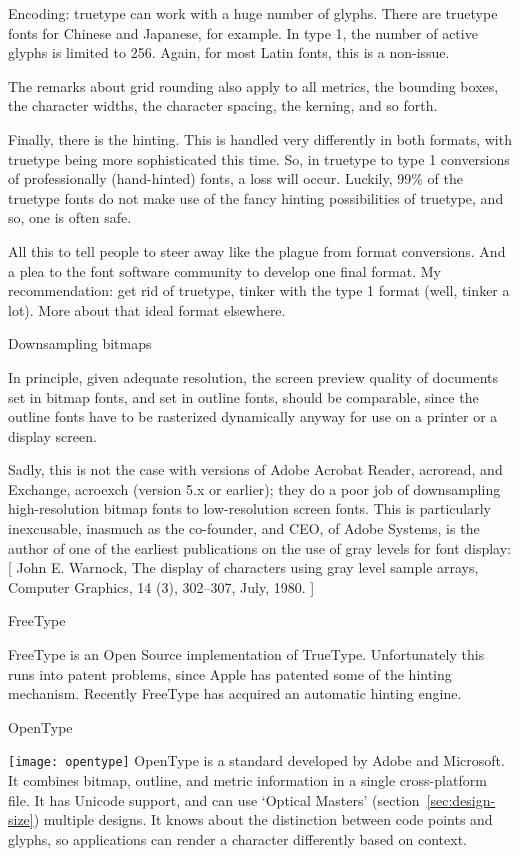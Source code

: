 Encoding: truetype can work with a huge number of glyphs. There are
truetype fonts for Chinese and Japanese, for example. In type 1, the
number of active glyphs is limited to 256. Again, for most Latin
fonts, this is a non-issue.

The remarks about grid rounding also apply to all metrics, the
bounding boxes, the character widths, the character spacing, the
kerning, and so forth.

Finally, there is the hinting. This is handled very differently in
both formats, with truetype being more sophisticated this time. So, in
truetype to type 1 conversions of professionally (hand-hinted) fonts,
a loss will occur. Luckily, 99\% of the truetype fonts do not make use
of the fancy hinting possibilities of truetype, and so, one is often
safe.

All this to tell people to steer away like the plague from format
conversions. And a plea to the font software community to develop one
final format. My recommendation: get rid of truetype, tinker with the
type 1 format (well, tinker a lot). More about that ideal format
elsewhere.

 {Downsampling bitmaps}

In principle, given adequate resolution, the screen preview quality of
documents set in bitmap fonts, and set in outline fonts, should be
comparable, since the outline fonts have to be rasterized dynamically
anyway for use on a printer or a display screen.

Sadly, this is not the case with versions of Adobe Acrobat Reader,
acroread, and Exchange, acroexch (version 5.x or earlier); they do a
poor job of downsampling high-resolution bitmap fonts to
low-resolution screen fonts. This is particularly inexcusable,
inasmuch as the co-founder, and CEO, of Adobe Systems, is the author
of one of the earliest publications on the use of gray levels for font
display: [ John E. Warnock, The display of characters using gray level
sample arrays, Computer Graphics, 14 (3), 302--307, July, 1980.  ]

 {FreeType}

FreeType is an Open Source implementation of
TrueType. Unfortunately this runs into patent problems, since Apple
has patented some of the hinting mechanism. Recently FreeType has
acquired an automatic hinting engine.

 {OpenType}

\texttt{[image: opentype]}
OpenType is a standard developed by Adobe and
Microsoft. It combines bitmap, outline, and metric information in a
single cross-platform file. It has Unicode support, and can use
`Optical Masters' (section~\ref{sec:design-size}) multiple designs. It
knows about the distinction between code points and glyphs, so
applications can render a character differently based on context.


